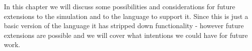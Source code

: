 In this chapter we will discuss some possibilities and considerations for future extensions to the simulation and to the language to support it.
Since this is just a basic version of the language it has stripped down functionality - however future extensions are possible and we will cover what intentions we could have for future work.